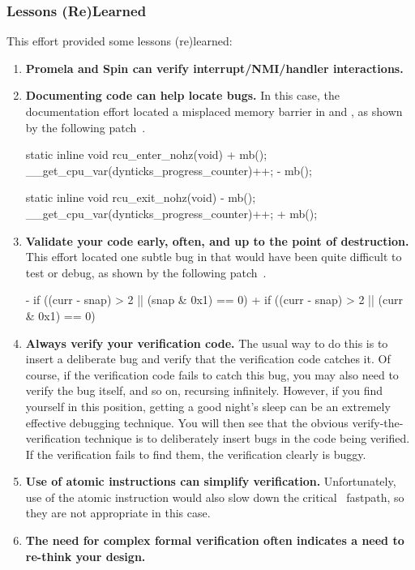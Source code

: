 \subsubsection{Lessons (Re)Learned}
\label{sec:formal:Lessons (Re)Learned}

This effort provided some lessons (re)learned:

\begin{enumerate}
\item	{\bf Promela and Spin can verify interrupt\slash NMI\-/handler
	interactions.}
\item	{\bf Documenting code can help locate bugs.}
	In this case, the documentation effort located
	a misplaced memory barrier in
	 and ,
	as shown by the following patch~\cite{PaulEMcKenney2008commit:d7c0651390b6}.

\begin{VerbatimU}
 static inline void rcu_enter_nohz(void)
 {
+       mb();
        __get_cpu_var(dynticks_progress_counter)++;
-       mb();
 }

 static inline void rcu_exit_nohz(void)
 {
-       mb();
        __get_cpu_var(dynticks_progress_counter)++;
+       mb();
 }
\end{VerbatimU}

\item	{\bf Validate your code early, often, and up to the point
	of destruction.}
	This effort located one subtle bug in
	that would have been quite difficult to test or debug, as
	shown by the following patch~\cite{PaulEMcKenney2008commit:ae66be9b71b1}.

\begin{VerbatimU}
-       if ((curr - snap) > 2 || (snap & 0x1) == 0)
+       if ((curr - snap) > 2 || (curr & 0x1) == 0)
\end{VerbatimU}

\item	{\bf Always verify your verification code.}
	The usual way to do this is to insert a deliberate bug
	and verify that the verification code catches it.  Of course,
	if the verification code fails to catch this bug, you may also
	need to verify the bug itself, and so on, recursing infinitely.
	However, if you find yourself in this position,
	getting a good night's sleep
	can be an extremely effective debugging technique.
	You will then see that the obvious verify-the-verification
	technique is to deliberately insert bugs in the code being
	verified.
	If the verification fails to find them, the verification clearly
	is buggy.
\item	{\bf Use of atomic instructions can simplify verification.}
	Unfortunately, use of the  atomic instruction
	would also slow down the critical \IRQ\ fastpath, so they
	are not appropriate in this case.
\item	{\bf The need for complex formal verification often indicates
	a need to re-think your design.}
\end{enumerate}

